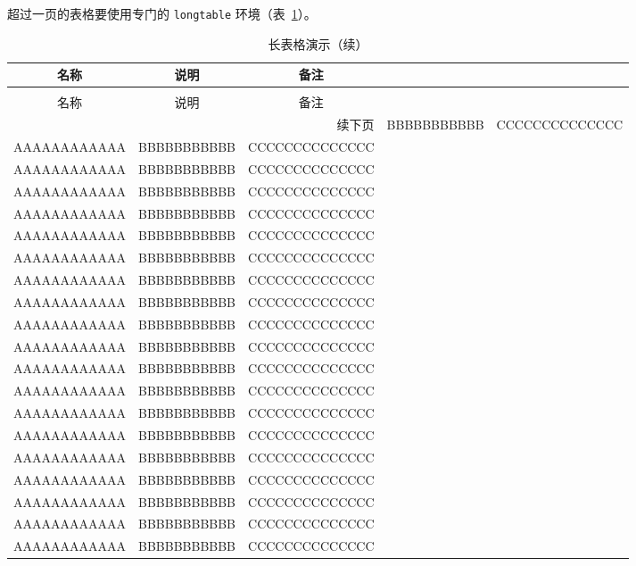 超过一页的表格要使用专门的 \texttt{longtable} 环境（表~\ref{tab:longtable}）。
\begin{longtable}{ccc}
  \caption[长表格演示]{长表格演示}
  \label{tab:longtable}\\
  \toprule[1.5pt]
    名称  & 说明 & 备注\\
  \midrule[1pt]
  \endfirsthead
  \caption[]{长表格演示（续）} \\
  \toprule[1.5pt]
  名称  & 说明 & 备注 \\
  \midrule[1pt]
  \endhead
  \hline
  \multicolumn{3}{r}{\small 续下页}
  \endfoot
  \bottomrule[1.5pt]
  \endlastfoot

  AAAAAAAAAAAA   &   BBBBBBBBBBB   &   CCCCCCCCCCCCCC   \\
  AAAAAAAAAAAA   &   BBBBBBBBBBB   &   CCCCCCCCCCCCCC   \\
  AAAAAAAAAAAA   &   BBBBBBBBBBB   &   CCCCCCCCCCCCCC   \\
  AAAAAAAAAAAA   &   BBBBBBBBBBB   &   CCCCCCCCCCCCCC   \\
  AAAAAAAAAAAA   &   BBBBBBBBBBB   &   CCCCCCCCCCCCCC   \\
  AAAAAAAAAAAA   &   BBBBBBBBBBB   &   CCCCCCCCCCCCCC   \\
  AAAAAAAAAAAA   &   BBBBBBBBBBB   &   CCCCCCCCCCCCCC   \\
  AAAAAAAAAAAA   &   BBBBBBBBBBB   &   CCCCCCCCCCCCCC   \\
  AAAAAAAAAAAA   &   BBBBBBBBBBB   &   CCCCCCCCCCCCCC   \\
  AAAAAAAAAAAA   &   BBBBBBBBBBB   &   CCCCCCCCCCCCCC   \\
  AAAAAAAAAAAA   &   BBBBBBBBBBB   &   CCCCCCCCCCCCCC   \\
  AAAAAAAAAAAA   &   BBBBBBBBBBB   &   CCCCCCCCCCCCCC   \\
  AAAAAAAAAAAA   &   BBBBBBBBBBB   &   CCCCCCCCCCCCCC   \\
  AAAAAAAAAAAA   &   BBBBBBBBBBB   &   CCCCCCCCCCCCCC   \\
  AAAAAAAAAAAA   &   BBBBBBBBBBB   &   CCCCCCCCCCCCCC   \\
  AAAAAAAAAAAA   &   BBBBBBBBBBB   &   CCCCCCCCCCCCCC   \\
  AAAAAAAAAAAA   &   BBBBBBBBBBB   &   CCCCCCCCCCCCCC   \\
  AAAAAAAAAAAA   &   BBBBBBBBBBB   &   CCCCCCCCCCCCCC   \\
  AAAAAAAAAAAA   &   BBBBBBBBBBB   &   CCCCCCCCCCCCCC   \\
  AAAAAAAAAAAA   &   BBBBBBBBBBB   &   CCCCCCCCCCCCCC   \\
\end{longtable}



